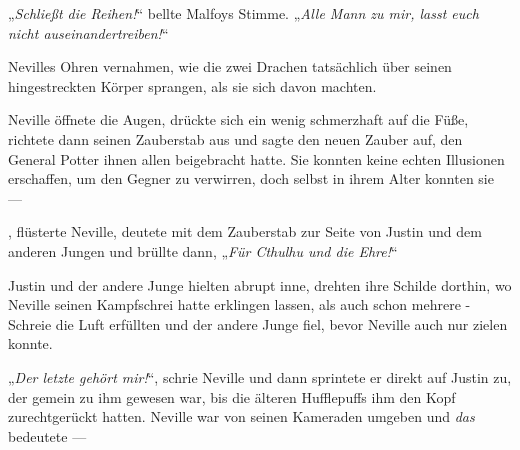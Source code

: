 „\emph{Schließt die Reihen!}“ bellte Malfoys Stimme.
„\emph{Alle Mann zu mir, lasst euch nicht auseinandertreiben!}“

Nevilles Ohren vernahmen, wie die zwei Drachen tatsächlich über seinen hingestreckten Körper sprangen, als sie sich davon machten.

Neville öffnete die Augen, drückte sich ein wenig schmerzhaft auf die Füße, richtete dann seinen Zauberstab aus und sagte den neuen Zauber auf, den General Potter ihnen allen beigebracht hatte. Sie konnten keine echten Illusionen erschaffen, um den Gegner zu verwirren, doch selbst in ihrem Alter konnten sie —

,%
flüsterte Neville, deutete mit dem Zauberstab zur Seite von Justin und dem anderen Jungen und brüllte dann,
„\emph{Für Cthulhu und die Ehre!}“

Justin und der andere Junge hielten abrupt inne, drehten ihre Schilde dorthin, wo Neville seinen Kampfschrei hatte erklingen lassen, als auch schon mehrere -Schreie die Luft erfüllten und der andere Junge fiel, bevor Neville auch nur zielen konnte.

„\emph{Der letzte gehört mir!}“, schrie Neville und dann sprintete er direkt auf Justin zu, der gemein zu ihm gewesen war, bis die älteren Hufflepuffs ihm den Kopf zurechtgerückt hatten. Neville war von seinen Kameraden umgeben und \emph{das} bedeutete —

